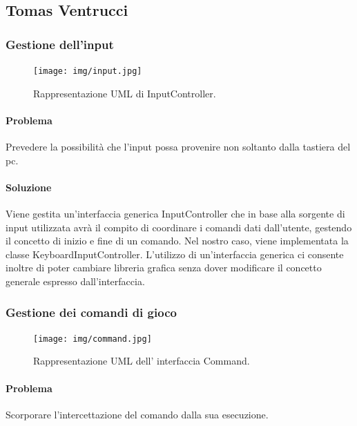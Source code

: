 \documentclass[a4paper,12pt]{report}
\begin{document}
\subsection*{Tomas Ventrucci}
%
\subsubsection*{Gestione dell’input}
%
\begin{figure}[H]
	\centering{}
	\texttt{[image: img/input.jpg]}
	\caption{Rappresentazione UML di InputController.}
	\end{figure}
%
\paragraph*{Problema} Prevedere la possibilità che l’input possa provenire non soltanto dalla tastiera del pc.
\paragraph*{Soluzione} Viene gestita un’interfaccia generica InputController che in base alla sorgente di input utilizzata avrà il compito di coordinare i comandi dati dall’utente, gestendo il concetto di inizio e fine di un comando. Nel nostro caso, viene implementata la classe KeyboardInputController. L’utilizzo di un’interfaccia generica ci consente inoltre di poter cambiare libreria grafica senza dover modificare il concetto generale espresso dall’interfaccia.
%
\newpage
\subsubsection*{Gestione dei comandi di gioco}
%
\begin{figure}[H]
	\centering{}
	\texttt{[image: img/command.jpg]}
	\caption{Rappresentazione UML dell' interfaccia Command.}
	\label{img:strategy}
	\end{figure}
%	
\paragraph*{Problema} Scorporare l'intercettazione del comando dalla sua esecuzione.
%
\end{document}
